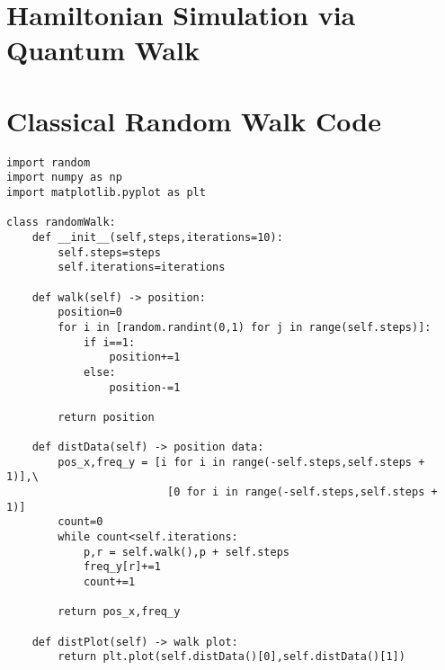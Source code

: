 \documentclass{article}
\begin{document}


\section{Hamiltonian Simulation via Quantum Walk}

\newpage


\newpage
\appendix
\section{Classical Random Walk Code}\label{app:1}
\begin{singlespace}
\begin{verbatim}
import random
import numpy as np
import matplotlib.pyplot as plt
    
class randomWalk:
    def __init__(self,steps,iterations=10):
        self.steps=steps
        self.iterations=iterations
        
    def walk(self) -> position:
        position=0
        for i in [random.randint(0,1) for j in range(self.steps)]:
            if i==1:
                position+=1
            else:
                position-=1
                
        return position
    
    def distData(self) -> position data:
        pos_x,freq_y = [i for i in range(-self.steps,self.steps + 1)],\
                         [0 for i in range(-self.steps,self.steps + 1)]
        count=0
        while count<self.iterations:
            p,r = self.walk(),p + self.steps
            freq_y[r]+=1 
            count+=1
        
        return pos_x,freq_y
    
    def distPlot(self) -> walk plot:
        return plt.plot(self.distData()[0],self.distData()[1])
\end{verbatim}
\end{singlespace}
\end{document}
